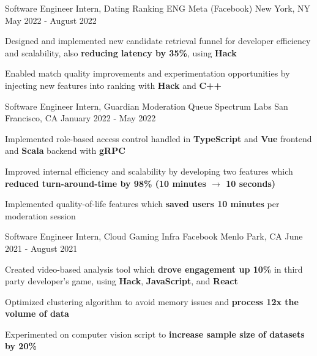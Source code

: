 

\begin{cventries}
  \cventry
    {Software Engineer Intern, Dating Ranking ENG} %
    {Meta (Facebook)} %
    {New York, NY} %
    {May 2022 - August 2022} %
    {
      \begin{cvitems} %
        \item {Designed and implemented new candidate retrieval funnel for developer efficiency and scalability, also \textbf{reducing latency by 35\%}, using \textbf{Hack}}
        \item {Enabled match quality improvements and experimentation opportunities by injecting new features into ranking with \textbf{Hack} and \textbf{C++}}
      \end{cvitems}
    }

  \cventry
    {Software Engineer Intern, Guardian Moderation Queue} %
    {Spectrum Labs} %
    {San Francisco, CA} %
    {January 2022 - May 2022} %
    {
      \begin{cvitems} %
        \item {Implemented role-based access control handled in \textbf{TypeScript} and \textbf{Vue} frontend and \textbf{Scala} backend with \textbf{gRPC}}
        \item {Improved internal efficiency and scalability by developing two features which \textbf{reduced turn-around-time by 98\% (10 minutes $\rightarrow$ 10 seconds)}}
        \item {Implemented quality-of-life features which \textbf{saved users 10 minutes} per moderation session}
      \end{cvitems}
    }

  \cventry
    {Software Engineer Intern, Cloud Gaming Infra} %
    {Facebook} %
    {Menlo Park, CA} %
    {June 2021 - August 2021} %
    {
      \begin{cvitems} %
        \item {Created video-based analysis tool which \textbf{drove engagement up 10\%} in third party developer's game, using \textbf{Hack}, \textbf{JavaScript}, and \textbf{React}}
        \item {Optimized clustering algorithm to avoid memory issues and \textbf{process 12x the volume of data}}
        \item {Experimented on computer vision script to \textbf{increase sample size of datasets by 20\%}}
      \end{cvitems}
    }


\end{cventries}
